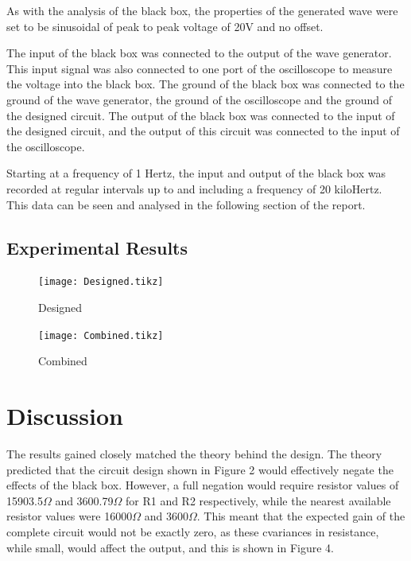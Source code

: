 \documentclass[12pt]{article} %
\begin{document}
As with the analysis of the black box, the properties of the generated wave were set to be sinusoidal of peak to peak voltage of 20V and no offset.

The input of the black box was connected to the output of the wave generator. This input signal was also connected to one port of the oscilloscope to measure the voltage into the black box. The ground of the black box was connected to the ground of the wave generator, the ground of the oscilloscope and the ground of the designed circuit. The output of the black box was connected to the input of the designed circuit, and the output of this circuit was connected to the input of the oscilloscope.

Starting at a frequency of 1 Hertz, the input and output of the black box was recorded at regular intervals up to and including a frequency of 20 kiloHertz. This data can be seen and analysed in the following section of the report.

\subsection{Experimental Results}



\begin{figure}
 	\centering
	\texttt{[image: Designed.tikz]}
	\caption{Designed}
\end{figure}

\begin{figure}
 	\centering
	\texttt{[image: Combined.tikz]}
	\caption{Combined}
\end{figure}

\pagebreak




\section{Discussion}

The results gained closely matched the theory behind the design. The theory predicted that the circuit design shown in Figure 2 would effectively negate the effects of the black box. However, a full negation would require resistor values of 15903.5$\Omega$ and 3600.79$\Omega$ for R1 and R2 respectively, while the nearest available resistor values were 16000$\Omega$ and 3600$\Omega$. This meant that the expected gain of the complete circuit would not be exactly zero, as these cvariances in resistance, while small, would affect the output, and this is shown in Figure 4.
\end{document}
